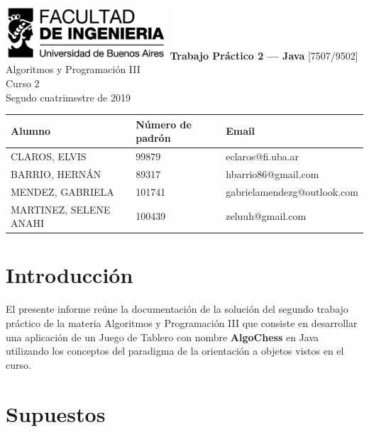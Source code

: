 \documentclass[titlepage,a4paper]{article}
\begin{document}
\begin{titlepage} %
	\hfill\includegraphics[width=6cm]{logofiuba.jpg}
    \centering
    \vfill
    \Huge \textbf{Trabajo Práctico 2 — Java}
    \vskip2cm
    \Large [7507/9502] Algoritmos y Programación III\\
    Curso 2 \\ %
    Segudo cuatrimestre de 2019 
    \vfill
    \begin{tabular}{ | l | l | l | } %
      \hline \hline
      Alumno & Número de padrón & Email\\ \hline \hline
      CLAROS, ELVIS & 99879 & eclaros@fi.uba.ar\\ \hline
      BARRIO, HERNÁN & 89317 & hbarrio86@gmail.com\\ \hline
      MENDEZ, GABRIELA & 101741 & gabrielamendezg@outlook.com\\ \hline
      MARTINEZ, SELENE ANAHI & 100439 & zeluuh@gmail.com\\ \hline
  	\end{tabular}
    \vfill
    \vfill
\end{titlepage}

\tableofcontents %
\newpage

\section{Introducción}\label{sec:intro}
El presente informe reúne la documentación de la solución del segundo trabajo práctico de la materia Algoritmos y Programación III que consiste en desarrollar una aplicación de un Juego de Tablero con nombre \textbf{AlgoChess} en Java utilizando los conceptos del paradigma de la orientación a objetos vistos en el curso.

\section{Supuestos}\label{sec:supuestos}
\end{document}
